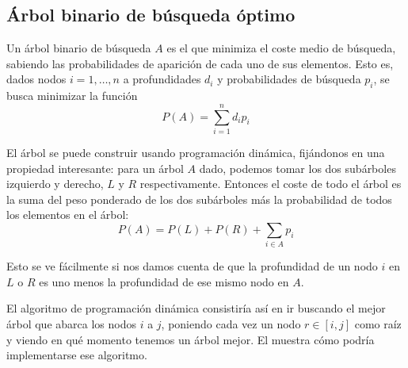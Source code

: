 \documentclass[palatino, nochap]{apuntes}
\begin{document}
\subsection{Árbol binario de búsqueda óptimo}

Un árbol binario de búsqueda $A$ es el que minimiza el coste medio de búsqueda, sabiendo las probabilidades de aparición de cada uno de sus elementos. Esto es, dados nodos $i = 1,\dotsc, n$ a profundidades $d_i$ y probabilidades de búsqueda $p_i$, se busca minimizar la función \[ P(A) = \sum_{i=1}^n d_i p_i\]

El árbol se puede construir usando programación dinámica, fijándonos en una propiedad interesante: para un árbol $A$ dado, podemos tomar los dos subárboles izquierdo y derecho, $L$ y $R$ respectivamente. Entonces el coste de todo el árbol es la suma del peso ponderado de los dos subárboles más la probabilidad de todos los elementos en el árbol: \[ P(A) = P(L) + P(R) + \sum_{i ∈ A} p_i \]

Esto se ve fácilmente si nos damos cuenta de que la profundidad de un nodo $i$ en $L$ o $R$ es uno menos la profundidad de ese mismo nodo en $A$.

El algoritmo de programación dinámica consistiría así en ir buscando el mejor árbol que abarca los nodos $i$ a $j$, poniendo cada vez un nodo $r ∈ [i,j]$ como raíz y viendo en qué momento tenemos un árbol mejor. El  muestra cómo podría implementarse ese algoritmo.
\end{document}
